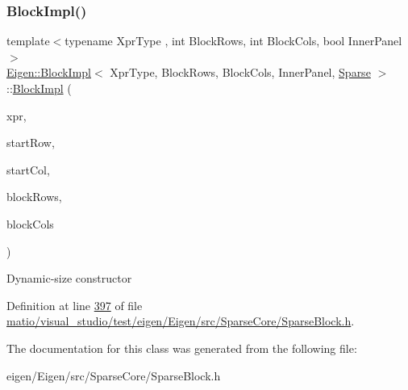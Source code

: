 \subsubsection{\texorpdfstring{Block\+Impl()}{BlockImpl()}\hspace{0.1cm}{\footnotesize\ttfamily [4/4]}}
{\footnotesize\ttfamily template$<$typename Xpr\+Type , int Block\+Rows, int Block\+Cols, bool Inner\+Panel$>$ \\
\hyperlink{class_eigen_1_1_block_impl}{Eigen\+::\+Block\+Impl}$<$ Xpr\+Type, Block\+Rows, Block\+Cols, Inner\+Panel, \hyperlink{struct_eigen_1_1_sparse}{Sparse} $>$\+::\hyperlink{class_eigen_1_1_block_impl}{Block\+Impl} (\begin{DoxyParamCaption}\item[{Xpr\+Type \&}]{xpr,  }\item[{\hyperlink{group___core___module_a554f30542cc2316add4b1ea0a492ff02}{Index}}]{start\+Row,  }\item[{\hyperlink{group___core___module_a554f30542cc2316add4b1ea0a492ff02}{Index}}]{start\+Col,  }\item[{\hyperlink{group___core___module_a554f30542cc2316add4b1ea0a492ff02}{Index}}]{block\+Rows,  }\item[{\hyperlink{group___core___module_a554f30542cc2316add4b1ea0a492ff02}{Index}}]{block\+Cols }\end{DoxyParamCaption})\hspace{0.3cm}{\ttfamily [inline]}}

Dynamic-\/size constructor 

Definition at line \hyperlink{matio_2visual__studio_2test_2eigen_2_eigen_2src_2_sparse_core_2_sparse_block_8h_source_l00397}{397} of file \hyperlink{matio_2visual__studio_2test_2eigen_2_eigen_2src_2_sparse_core_2_sparse_block_8h_source}{matio/visual\+\_\+studio/test/eigen/\+Eigen/src/\+Sparse\+Core/\+Sparse\+Block.\+h}.



The documentation for this class was generated from the following file\+:\begin{DoxyCompactItemize}
\item 
eigen/\+Eigen/src/\+Sparse\+Core/\+Sparse\+Block.\+h\end{DoxyCompactItemize}
